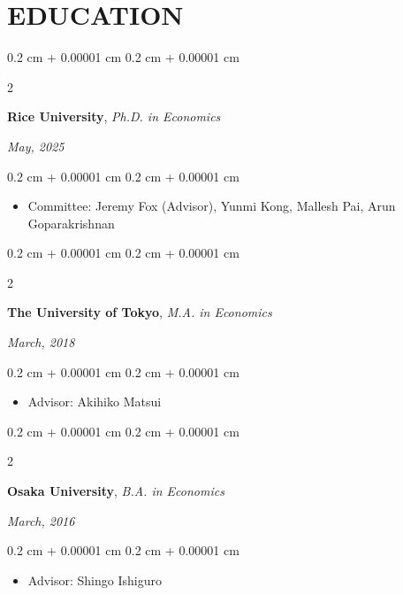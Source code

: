 \documentclass[10pt, letterpaper]{article}
\newenvironment{highlights}{
    \begin{itemize}[
        topsep=0.10 cm,
        parsep=0.10 cm,
        partopsep=0pt,
        itemsep=0.0 cm,
        leftmargin=0.4 cm + 10pt
    ]
}{
    \end{itemize}
} %
\newenvironment{onecolentry}{
    \begin{adjustwidth}{
        0.2 cm + 0.00001 cm
    }{
        0.2 cm + 0.00001 cm
    }
}{
    \end{adjustwidth}
} %
\newenvironment{twocolentry}[2][]{
    \onecolentry
    \def\secondColumn{#2}
    \setcolumnwidth{\fill, 4.5 cm}
    \begin{paracol}{2}
}{
    \switchcolumn \raggedleft \secondColumn
    \end{paracol}
    \endonecolentry
} %
\begin{document}
    \section{EDUCATION}
    \begin{twocolentry}{
        \textit{May, 2025}}
        \textbf{Rice University},
        \textit{Ph.D. in Economics}
    \end{twocolentry}
    \vspace{0.10 cm}
    \begin{onecolentry}
        \begin{highlights}
            \item Committee: Jeremy Fox (Advisor), Yunmi Kong, Mallesh Pai, Arun Goparakrishnan
        \end{highlights}
    \end{onecolentry}
    \vspace{0.10 cm}
    \begin{twocolentry}{
        \textit{March, 2018}}
        \textbf{The University of Tokyo},       
        \textit{M.A. in Economics}
    \end{twocolentry}
    \vspace{0.10 cm}
    \begin{onecolentry}
        \begin{highlights}
            \item Advisor: Akihiko Matsui
        \end{highlights}
    \end{onecolentry}
    \vspace{0.10 cm}
    \begin{twocolentry}{
        \textit{March, 2016}}
        \textbf{Osaka University},
        \textit{B.A. in Economics}
    \end{twocolentry}
    \vspace{0.10 cm}
    \begin{onecolentry}
        \begin{highlights}
            \item Advisor: Shingo Ishiguro
        \end{highlights}
    \end{onecolentry}
\end{document}
